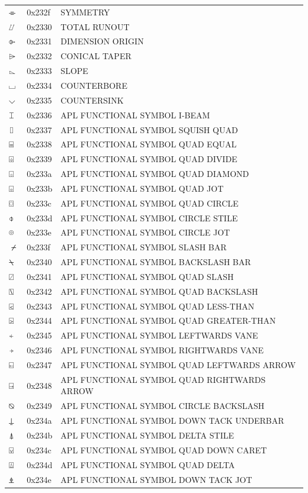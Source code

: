 \documentclass[12pt, twoside]{article}
\begin{document}
\begin{longtable}{L{1.0cm} L{2.0cm} >{\footnotesize}L{10cm}}
$⌯$&0x232f&SYMMETRY\\
$⌰$&0x2330&TOTAL RUNOUT\\
$⌱$&0x2331&DIMENSION ORIGIN\\
$⌲$&0x2332&CONICAL TAPER\\
$⌳$&0x2333&SLOPE\\
$⌴$&0x2334&COUNTERBORE\\
$⌵$&0x2335&COUNTERSINK\\
$⌶$&0x2336&APL FUNCTIONAL SYMBOL I-BEAM\\
$⌷$&0x2337&APL FUNCTIONAL SYMBOL SQUISH QUAD\\
$⌸$&0x2338&APL FUNCTIONAL SYMBOL QUAD EQUAL\\
$⌹$&0x2339&APL FUNCTIONAL SYMBOL QUAD DIVIDE\\
$⌺$&0x233a&APL FUNCTIONAL SYMBOL QUAD DIAMOND\\
$⌻$&0x233b&APL FUNCTIONAL SYMBOL QUAD JOT\\
$⌼$&0x233c&APL FUNCTIONAL SYMBOL QUAD CIRCLE\\
$⌽$&0x233d&APL FUNCTIONAL SYMBOL CIRCLE STILE\\
$⌾$&0x233e&APL FUNCTIONAL SYMBOL CIRCLE JOT\\
$⌿$&0x233f&APL FUNCTIONAL SYMBOL SLASH BAR\\
$⍀$&0x2340&APL FUNCTIONAL SYMBOL BACKSLASH BAR\\
$⍁$&0x2341&APL FUNCTIONAL SYMBOL QUAD SLASH\\
$⍂$&0x2342&APL FUNCTIONAL SYMBOL QUAD BACKSLASH\\
$⍃$&0x2343&APL FUNCTIONAL SYMBOL QUAD LESS-THAN\\
$⍄$&0x2344&APL FUNCTIONAL SYMBOL QUAD GREATER-THAN\\
$⍅$&0x2345&APL FUNCTIONAL SYMBOL LEFTWARDS VANE\\
$⍆$&0x2346&APL FUNCTIONAL SYMBOL RIGHTWARDS VANE\\
$⍇$&0x2347&APL FUNCTIONAL SYMBOL QUAD LEFTWARDS ARROW\\
$⍈$&0x2348&APL FUNCTIONAL SYMBOL QUAD RIGHTWARDS ARROW\\
$⍉$&0x2349&APL FUNCTIONAL SYMBOL CIRCLE BACKSLASH\\
$⍊$&0x234a&APL FUNCTIONAL SYMBOL DOWN TACK UNDERBAR\\
$⍋$&0x234b&APL FUNCTIONAL SYMBOL DELTA STILE\\
$⍌$&0x234c&APL FUNCTIONAL SYMBOL QUAD DOWN CARET\\
$⍍$&0x234d&APL FUNCTIONAL SYMBOL QUAD DELTA\\
$⍎$&0x234e&APL FUNCTIONAL SYMBOL DOWN TACK JOT\\

\end{longtable}
\end{document}
